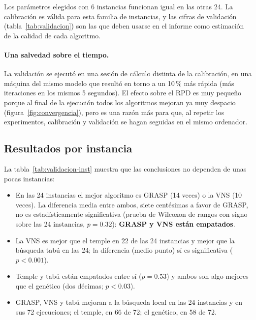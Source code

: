 \begin{idea}
Los parámetros elegidos con 6 instancias funcionan igual en las otras 24. La calibración es
válida para esta familia de instancias, y las cifras de validación (tabla~\ref{tab:validacion})
son las que deben usarse en el informe como estimación de la calidad de cada algoritmo.
\end{idea}

\paragraph{Una salvedad sobre el tiempo.} La validación se ejecutó en una sesión de cálculo
distinta de la calibración, en una máquina del mismo modelo que resultó en torno a un 10\,\%
más rápida (más iteraciones en los mismos 5 segundos). El efecto sobre el RPD es muy pequeño
porque al final de la ejecución todos los algoritmos mejoran ya muy despacio
(figura~\ref{fig:convergencia}), pero es una razón más para que, al repetir los experimentos,
calibración y validación se hagan seguidas en el mismo ordenador.

\subsection{Resultados por instancia}



La tabla~\ref{tab:validacion-inst} muestra que las conclusiones no dependen de unas pocas
instancias:
\begin{itemize}
  \item En las 24 instancias el mejor algoritmo es GRASP (14 veces) o la VNS (10 veces). La
        diferencia media entre ambos, siete centésimas a favor de GRASP, no es
        estadísticamente significativa (prueba de Wilcoxon de rangos con signo sobre las 24
        instancias, $p=0.32$): \textbf{GRASP y VNS están empatados}.
  \item La VNS es mejor que el temple en 22 de las 24 instancias y mejor que la búsqueda tabú
        en las 24; la diferencia (medio punto) sí es significativa ($p<0.001$).
  \item Temple y tabú están empatados entre sí ($p=0.53$) y ambos son algo mejores que el
        genético (dos décimas; $p<0.03$).
  \item GRASP, VNS y tabú mejoran a la búsqueda local en las 24 instancias y en sus 72
        ejecuciones; el temple, en 66 de 72; el genético, en 58 de 72.
\end{itemize}

